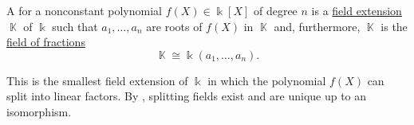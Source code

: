 \begin{definition}\label{def:splitting_field}
  A  for a nonconstant polynomial \( f(X) \in \Bbbk[X] \) of degree \( n \) is a \hyperref[def:field_extension]{field extension} \( \BbbK \) of \( \Bbbk \) such that \( a_1, \ldots, a_n \) are roots of \( f(X) \) in \( \BbbK \) and, furthermore, \( \BbbK \) is the \hyperref[thm:field_of_fractions]{field of fractions}
  \begin{equation*}
    \BbbK \cong \Bbbk(a_1, \ldots, a_n).
  \end{equation*}

  This is the smallest field extension of \( \Bbbk \) in which the polynomial \( f(X) \) can split into linear factors. By , splitting fields exist and are unique up to an isomorphism.
\end{definition}

